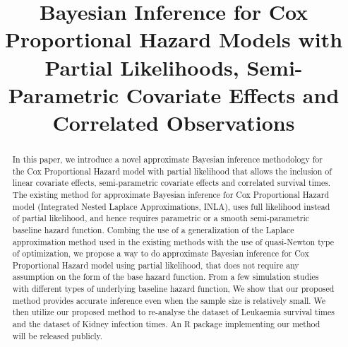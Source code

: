 \documentclass[ba]{imsart}
\begin{document}

\begin{frontmatter}
\title{Bayesian Inference for Cox Proportional Hazard Models with Partial Likelihoods, Semi-Parametric Covariate Effects and Correlated Observations}

\runtitle{}


\begin{abstract}
In this paper, we introduce a novel approximate Bayesian inference methodology for the Cox Proportional Hazard model with partial likelihood that allows the inclusion of linear covariate effects, semi-parametric covariate effects and correlated survival times. The existing method for approximate Bayesian inference for Cox Proportional Hazard model (Integrated Nested Laplace Approximations, INLA), uses full likelihood instead of partial likelihood, and hence requires parametric or a smooth semi-parametric baseline hazard function. Combing the use of a generalization of the Laplace approximation method used in the existing methods with the use of quasi-Newton type of optimization, we propose a way to do approximate Bayesian inference for Cox Proportional Hazard model using partial likelihood, that does not require any assumption on the form of the base hazard function. From a few simulation studies with different types of underlying baseline hazard function, We show that our proposed method provides accurate inference even when the sample size is relatively small. We then utilize our proposed method to re-analyse the dataset of Leukaemia survival times and the dataset of Kidney infection times. An R package implementing our method will be released publicly.
\end{abstract}

\begin{keyword}
\end{keyword}

\end{frontmatter}
\end{document}
